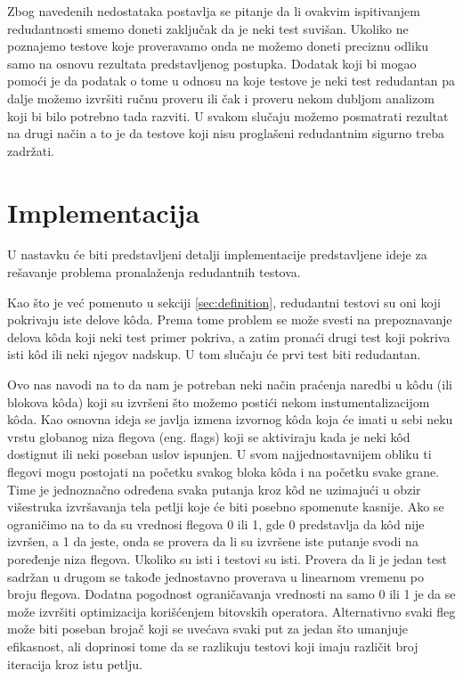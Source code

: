 \documentclass[a4paper]{article}
\begin{document}
Zbog navedenih nedostataka postavlja se pitanje da li ovakvim ispitivanjem redudantnosti smemo doneti zaključak da je neki test suvišan. Ukoliko ne poznajemo testove koje proveravamo onda ne možemo doneti preciznu odliku samo na osnovu rezultata predstavljenog postupka. Dodatak koji bi mogao pomoći je da podatak o tome u odnosu na koje testove je neki test redudantan pa dalje možemo izvršiti ručnu proveru ili čak i proveru nekom dubljom analizom koji bi bilo potrebno tada razviti. U svakom slučaju možemo posmatrati rezultat na drugi način a to je da testove koji nisu proglašeni redudantnim sigurno treba zadržati.

\section{Implementacija}
\label{sec:ideas}
U nastavku će biti predstavljeni detalji implementacije predstavljene ideje za rešavanje problema pronalaženja redudantnih testova.

Kao što je već pomenuto u sekciji \ref{sec:definition}, redudantni testovi su oni koji pokrivaju iste delove kôda. Prema tome problem se može svesti na prepoznavanje delova kôda koji neki test primer pokriva, a zatim pronaći drugi test koji pokriva isti kôd ili neki njegov nadskup. U tom slučaju će prvi test biti redudantan. 

Ovo nas navodi na to da nam je potreban neki način praćenja naredbi u kôdu (ili blokova kôda) koji su izvršeni što možemo postići nekom instumentalizacijom kôda. Kao osnovna ideja se javlja izmena izvornog kôda koja će imati u sebi neku vrstu globanog niza flegova (eng. flags) koji se aktiviraju kada je neki kôd dostignut ili neki poseban uslov ispunjen. U svom najjednostavnijem obliku ti flegovi mogu postojati na početku svakog bloka kôda i na početku svake grane. Time je jednoznačno određena svaka putanja kroz kôd ne uzimajući u obzir višestruka izvršavanja tela petlji koje će biti posebno spomenute kasnije. Ako se ograničimo na to da su vrednosi flegova 0 ili 1, gde 0 predstavlja da kôd nije izvršen, a 1 da jeste, onda se provera da li su izvršene iste putanje svodi na poređenje niza flegova. Ukoliko su isti i testovi su isti. Provera da li je jedan test sadržan u drugom se takođe jednostavno proverava u linearnom vremenu po broju flegova. Dodatna pogodnost ograničavanja vrednosti na samo 0 ili 1 je da se može izvršiti optimizacija korišćenjem bitovskih operatora. Alternativno svaki fleg može biti poseban brojač koji se uvećava svaki put za jedan što umanjuje efikasnost, ali doprinosi tome da se razlikuju testovi koji imaju različit broj iteracija kroz istu petlju. 
\end{document}
